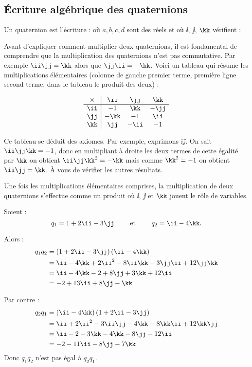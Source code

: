 \documentclass[11pt,class=report,crop=false]{standalone}
\begin{document}
\subsection{Écriture algébrique des quaternions}

Un quaternion est l'écriture :
où $a,b,c,d$ sont des réels et où $\ii$, $\jj$, $\kk$ vérifient :

Avant d'expliquer comment multiplier deux quaternions, il est fondamental de comprendre que la multiplication des quaternions n'est pas commutative.
Par exemple $\ii \jj = \kk$ alors que $\jj \ii = - \kk$. Voici un tableau qui résume les multiplications élémentaires (colonne de gauche premier terme, première ligne second terme, dans le tableau le produit des deux) :

$$\begin{array}{c|ccc}
  \times  & \ii  & \jj  & \kk \\ \hline
\ii       & -1   & \kk  & -\jj \\ 
\jj       & -\kk & -1   & \ii \\
\kk       & \jj  & -\ii & -1 \\
\end{array}$$

Ce tableau se déduit des axiomes. Par exemple, exprimons $\ii \jj$.
On sait $\ii \jj \kk = -1$, donc en multipliant à droite les deux termes de cette égalité par $\kk$ on obtient
$\ii \jj  \kk^2 = - \kk$ mais comme $\kk^2 = -1$ on obtient $\ii \jj = \kk$. À vous de vérifier les autres résultats.

Une fois les multiplications élémentaires comprises, la multiplication de deux quaternions s'effectue comme un produit où $\ii$, $\jj$ et $\kk$ jouent le rôle de variables.

\begin{exemple}
Soient :
$$q_1 = 1+ 2\ii -3\jj \qquad\text{ et }\qquad q_2 = \ii - 4\kk.$$

Alors :
\begin{align*}
q_1 q_2 
  &= \left( 1+ 2\ii -3\jj \right) \left( \ii - 4\kk \right) \\
  &= \ii -4\kk + 2\ii^2 -8 \ii\kk -3 \jj\ii+12\jj\kk \\
  &= \ii - 4\kk -2 +8\jj +3\kk + 12\ii \\
  &= -2 + 13\ii +8\jj -\kk 
\end{align*}

Par contre :
\begin{align*}
q_2 q_1 
  &= \left( \ii - 4\kk \right) \left( 1+ 2\ii -3\jj \right) \\
  &= \ii +2\ii^2 -3\ii\jj -4\kk -8\kk\ii + 12\kk\jj \\
  &= \ii -2 -3\kk -4\kk -8\jj -12\ii \\
  &= -2 -11\ii -8\jj -7\kk
\end{align*}
Donc $q_1q_2$ n'est pas égal à $q_2q_1$.
\end{exemple}
\end{document}
